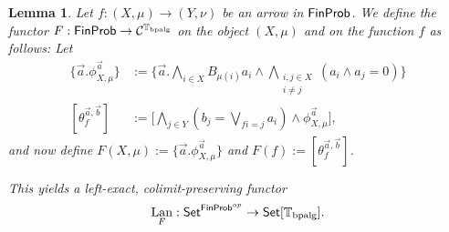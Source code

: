 \documentclass[a4paper]{amsproc}
\theoremstyle{plain}
\newtheorem{lemma}[theorem]{Lemma}
\theoremstyle{definition}
\theoremstyle{remark}
\numberwithin{equation}{section}
\DeclareMathOperator{\Lan}{Lan}
\newcommand{\Set}{\textup{\textsf{Set}}}
\newcommand{\FinProb}{\textup{\textsf{FinProb}}}
\begin{document}
\begin{lemma} \label{inverse}
Let $f: (X,\mu) \to (Y, \nu)$ be an arrow in $\FinProb$. We define the functor $F: \FinProb \to \mathcal{C}^{\mathbb{T}_{\textup{bpalg}}}$ on the object $(X,\mu)$ and on the function $f$ as follows: Let
\begin{align*}
\{\vec{a} . \phi_{X,\mu}^{\vec{a}}\} &:= \Bigg \{ \vec{a} . \bigwedge_{i \in X} B_{\mu(i)} a_i \wedge \bigwedge_{\substack{i,j \in X \\ i \neq j}} (a_i \wedge a_j = 0) \Bigg \} \\
[\theta_f^{\vec{a}, \vec{b}}] &:= \Bigg [ \bigwedge_{j \in Y} (b_j = \bigvee_{f i = j} a_i) \wedge \phi_{X,\mu}^{\vec{a}} \Bigg] ,
\end{align*}
and now define $F(X,\mu) := \{\vec{a} . \phi_{X,\mu}^{\vec{a}}\}$ and $F(f) := [\theta_f^{\vec{a}, \vec{b}}]$.

This yields a left-exact, colimit-preserving functor
\[
    \Lan_F: \Set^{\FinProb^{op}} \to \Set[\mathbb{T}_{\textup{bpalg}}] .
\]
\end{lemma}
\end{document}
